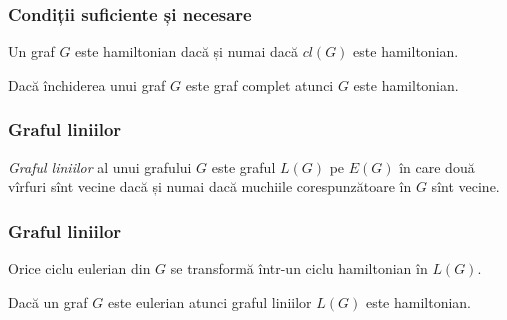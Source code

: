 \begin{frame}
  \frametitle{Condiții suficiente și necesare}

\begin{theorem}
Un graf $G$ este hamiltonian dacă și numai dacă $cl(G)$ este hamiltonian.
\end{theorem}
\pause

\begin{corollary}
Dacă închiderea unui graf $G$ este graf complet atunci $G$ este hamiltonian.
\end{corollary}


\end{frame}

\begin{frame}
  \frametitle{Graful liniilor}

\emph{Graful liniilor} al unui grafului $G$  este graful $L(G)$ pe $E(G)$ în care două vîrfuri sînt vecine dacă și numai dacă muchiile corespunzătoare în $G$ sînt vecine.
\pause

\begin{figure}
\centering%
\end{figure}
 
\end{frame}

\begin{frame}
  \frametitle{Graful liniilor}

Orice ciclu eulerian din $G$ se transformă într-un ciclu hamiltonian în $L(G)$.
\pause

\begin{theorem}
  Dacă un graf $G$ este eulerian atunci graful liniilor $L(G)$ este hamiltonian.
\end{theorem}

\end{frame}



